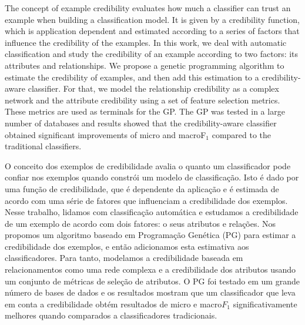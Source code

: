 The concept of example credibility evaluates how much a classifier can trust an example when building a classification model.
It is given by a credibility function, which is application dependent and estimated according to a series of factors that influence the credibility of the examples.
In this work, we deal with automatic classification and study the credibility of an example according to two factors: its attributes and relationships. 
We propose a genetic programming algorithm to estimate the credibility of examples, and then add this estimation to a credibility-aware classifier. 
For that, we model the relationship credibility as a complex network and the attribute credibility using a set of feature selection metrics. These metrics are used as terminals for the GP. The GP was tested in a large number of databases and results showed that the credibility-aware classifier obtained significant improvements of micro and macroF$_1$ compared to the traditional classifiers.




O conceito dos exemplos de credibilidade avalia o quanto um classificador pode confiar nos exemplos quando constrói um modelo de classificação.
Isto é dado por uma função de credibilidade, que é dependente da aplicação e é estimada de acordo com uma série de fatores que influenciam a credibilidade dos exemplos.
Nesse trabalho, lidamos com classificação automática e estudamos a credibilidade de um exemplo de acordo com dois fatores: o seus atributos e relações.
Nos propomos um algoritmo baseado em Programação Genética (PG) para estimar a credibilidade dos exemplos, e então adicionamos esta estimativa aos classificadores.
Para tanto, modelamos a credibilidade baseada em relacionamentos como uma rede complexa e a credibilidade dos atributos usando um conjunto de métricas de seleção de atributos.
O PG foi testado em um grande número de bases de dados e os resultados mostram que um classificador que leva em conta a credibilidade obtém resultados de micro e macro$F_1$ significativamente melhores quando comparados a classificadores tradicionais.
